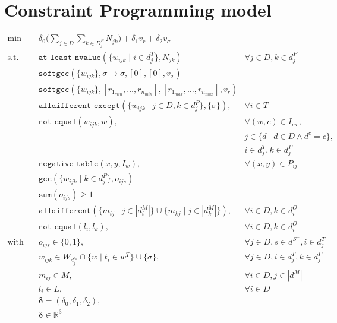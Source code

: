 \documentclass[../../thesis.tex]{subfiles}
\begin{document}
\chapter{Constraint Programming model}
 
\begin{align*}
  \text{min} \quad &\delta_0 \big( \sum_{j \in D} \sum_{k \in D^P_j} N_{jk} \big) + \delta_1 v_r + \delta_2 v_{\sigma} \\
  \text{s.t.} \quad &\texttt{at\_least\_nvalue}(\{ w_{ijk} \mid i \in d^T_j \}, N_{jk}) &\forall j \in D, k \in d^P_j \\
  &\texttt{softgcc}(\{ w_{ijk} \}, \sigma \rightarrow \sigma, [0], [0], v_{\sigma})  \\ 
  &\texttt{softgcc}(\{ w_{ijk} \}, [r_{1_{min}}, \dots, r_{n_{min}}], [r_{1_{max}}, \dots, r_{n_{max}}], v_{r}) \\
  &\texttt{alldifferent\_except}(\{w_{ijk} \mid j \in D, k \in d_j^P \}, \{ \sigma \}), &\forall i \in T \\ 
  &\texttt{not\_equal}(w_{ijk}, w), & \forall (w, c) \in I_{wc}, \\ 
  && j \in \{ d \mid d \in D \land d^c = c \}, \\
  && i \in d^T_j, k \in d_j^P \\
  &\texttt{negative\_table}(x, y, I_{w}),  &\forall (x, y) \in P_{ij} \\ 
  &\texttt{gcc}(\{ w_{ijk} \mid k \in d^P_j \}, o_{ijs}) \\ 
  &\texttt{sum}(o_{ijs}) \geq 1 \\
  &\texttt{alldifferent}(\{ m_{ij} \mid j \in |d_i^M| \} \cup \{ m_{kj} \mid j \in |d_k^M| \}), &\forall i \in D, k \in d^O_i \\
  &\texttt{not_equal}(l_{i}, l_{k}), &\forall i \in D, k \in d^O_i \\
  \text{with} \quad & o_{ijs} \in \{ 0, 1 \}, & \forall j \in D, s \in d^{S^{+}}, i \in d^T_j \\ 
  &w_{ijk} \in W_{d^{s_k}_j} \cap \{ w \mid t_i \in w^T \} \cup \{ \sigma \},& \forall j \in D, i \in d^T_j, k \in d^P_j \\ 
  &m_{ij} \in M, & \forall i \in D, j \in |d^M| \\ 
  &l_{i} \in L, & \forall i \in D \\
  &\bm{\delta} = (\delta_0, \delta_1, \delta_2), \\
  &\bm{\delta} \in \mathbb{R}^3
\end{align*}
\end{document}
